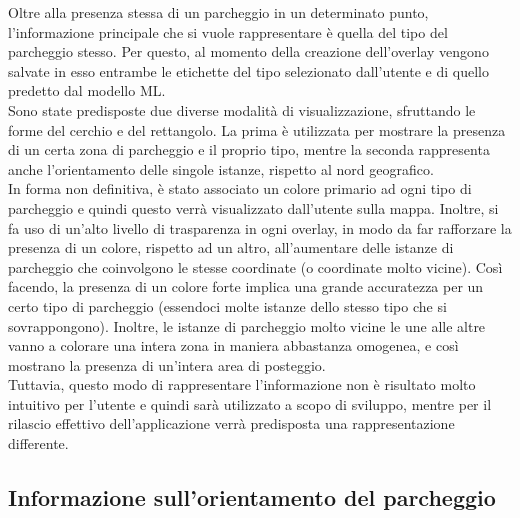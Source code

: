 Oltre alla presenza stessa di un parcheggio in un determinato punto, l'informazione
principale che si vuole rappresentare è quella del tipo del parcheggio stesso.
Per questo, al momento della creazione dell'overlay vengono salvate in esso 
entrambe le etichette del tipo selezionato dall'utente e di quello predetto
dal modello ML.\\
Sono state predisposte due diverse modalità di visualizzazione, sfruttando le 
forme del cerchio e del rettangolo. La prima è utilizzata per mostrare la 
presenza di un certa zona di parcheggio e il proprio tipo, mentre la seconda
rappresenta anche l'orientamento delle singole istanze, rispetto al nord geografico.\\
In forma non definitiva, è stato associato un colore primario ad ogni tipo di 
parcheggio e quindi questo verrà visualizzato dall'utente sulla mappa. Inoltre,
si fa uso di un'alto livello di trasparenza in ogni overlay, in modo da far 
rafforzare la presenza di un colore, rispetto ad un altro, all'aumentare delle
istanze di parcheggio che coinvolgono le stesse coordinate (o coordinate molto
vicine). Così facendo, la presenza di un colore forte implica una grande 
accuratezza per un certo tipo di parcheggio (essendoci molte istanze dello stesso
tipo che si sovrappongono). Inoltre, le istanze di parcheggio molto vicine le une alle
altre vanno a colorare una intera zona in maniera abbastanza omogenea, e così mostrano
la presenza di un'intera area di posteggio.\\
Tuttavia, questo modo di rappresentare 
l'informazione non è risultato molto intuitivo per l'utente e quindi sarà utilizzato 
a scopo di sviluppo, mentre per il rilascio effettivo dell'applicazione verrà predisposta
una rappresentazione differente.

\subsection{Informazione sull'orientamento del parcheggio} 

